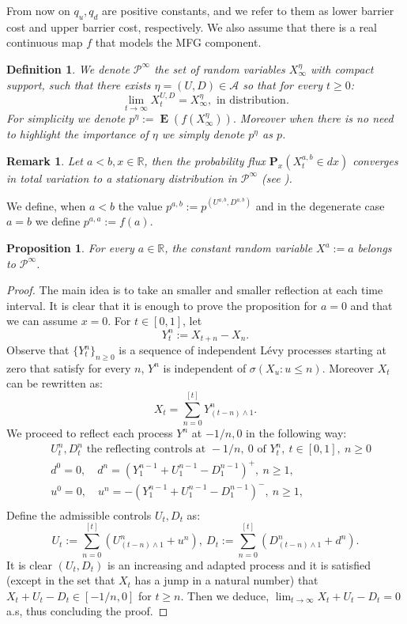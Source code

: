 \documentclass{article}
\newtheorem{proposition}[thm]{Proposition}
\newtheorem{remark}[thm]{Remark}
\newtheorem{definition}[thm]{Definition}
\newcommand\E{\operatorname{\mathbf{E}}}
\begin{document}
 
From now on $q_u, q_d $ are positive constants, 
and we refer to them as lower barrier cost and upper barrier cost, respectively. We also assume that there is a real continuous map $f$  that models the MFG component.  

\begin{definition}\label{Ch4DefinitionStationarymeasure}
We denote $\mathcal{P}^{\infty} $ the set of random variables $X^{\eta}_{\infty}$ with compact support, such that  there exists $\eta=(U,D) \in \mathcal{A}$ so that for every $ t \geq 0$: 
 $$\lim_{t \to \infty}X_t^{U,D}= X^{\eta}_{\infty},   \text{ in distribution} .$$
 For simplicity we denote $p^{\eta}:= \E \left(f(X_{\infty}^{\eta}) \right). $ Moreover when there is no need to highlight the importance of $\eta$ we simply denote  $p^{\eta} $ as $p$.
\end{definition}



\begin{remark}
Let $a<b,x \in \mathbb{R}$, then the probability flux $\mathbf{P}_x(X^{a,b}_t \in dx)$ converges in total variation to a stationary distribution in $\mathcal{P}^{\infty}$ (see \cite[Section V]{AAGP}).
\end{remark}
We define, when $a <b$ the value $p^{a,b}:=p^{(U^{a,b},D^{a,b})}$ and in the degenerate case $a=b$ we define $p^{a,a}:=f(a) $.

\begin{proposition}
 For every $a \in \mathbb{R}$, the constant random variable $X^a:=a $ belongs to $\mathcal{P}^{\infty}$. 
\end{proposition}
\begin{proof}
    The main idea is to take an smaller and smaller reflection at each time interval. It is clear that it is enough to prove the proposition for $a=0$ and that we can assume $x=0$. For $t \in [0,1]$, let  
    $$Y^n_t :=X_{t+n}-X_n . $$
Observe that $\lbrace Y^n_t \rbrace_{n \geq 0}$ is a sequence of independent L\'evy processes starting at zero that satisfy for every $n$, $Y^n$ is independent of $\sigma (X_u : u \leq n) $. Moreover $X_t$ can be rewritten as:
$$X_t=\sum_{n=0}^{[t]} Y^n_{(t-n) \wedge 1} . $$
We proceed to reflect each process $Y^n$ at $-1/n,0$ in the following way:
    \begin{align*}
    & U^n_t, D^n_t \text{ the reflecting controls at } -1/n, \ 0 \text{ of }Y^n_t , \ t \in [0,1], \ n \geq 0  \\
    &d^0=0, \quad  d^n=(Y^{n-1}_1+U^{n-1}_1-D^{n-1}_1)^+, \ n \geq 1, \\\
    &u^0=0, \quad  u^n=-(Y^{n-1}_1+U^{n-1}_1-D^{n-1}_1)^-, \ n \geq 1, \\\
    \end{align*}
Define the admissible controls $U_t,D_t$ as:
$$U_t:= \sum_{n=0}^{[t]}\left( U^n_{(t-n) \wedge 1 }+u^n \right) , \  D_t:= \sum_{n=0}^{[t]}\left( D^n_{(t-n) \wedge 1 } +d^n \right)  .$$
It is clear $(U_t,D_t)$ is an increasing and adapted process and it is satisfied (except in the set that $X_t$ has a jump in a natural number) that $X_t +U_t-D_t \in [-1/n,0]$ for $t \geq n$. Then we deduce, $\lim_{t \to \infty}X_t+
U_t-D_t=0$ a.s, thus concluding the proof. 
\end{proof}
\end{document}
